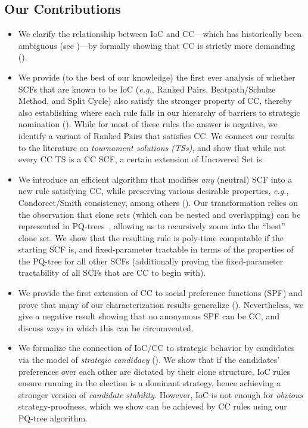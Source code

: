\subsection{Our Contributions}
\begin{itemize}[leftmargin=*]
    \item We clarify the relationship between IoC and CC---which has historically been ambiguous (see )---by formally showing that CC is strictly more demanding (). 
    \item We provide (to the best of our knowledge) the first ever analysis of whether SCFs that are known to be IoC (\emph{e.g.}, Ranked Pairs, Beatpath/Schulze Method, and Split Cycle) also satisfy the stronger property of CC, thereby also establishing where each rule falls in our hierarchy of barriers to strategic nomination (). While for most of these rules the answer is negative, we identify a variant of Ranked Pairs that satisfies CC. We connect our results to the literature on \emph{tournament solutions (TSs)}, and show that while not every CC TS is a CC SCF, a certain extension of Uncovered Set is.
    \item We introduce an efficient algorithm that modifies \emph{any} (neutral) SCF into a new rule satisfying CC, while preserving various desirable properties, \emph{e.g.}, Condorcet/Smith consistency, among others (). Our transformation relies on the observation that clone sets (which can be nested and overlapping) can be represented in PQ-trees~\citep{Elkind10:Clone}, allowing us to recursively zoom into the ``best'' clone set. We show that the resulting rule is poly-time computable if the starting SCF is, and fixed-parameter tractable in terms of the properties of the PQ-tree for all other SCFs (additionally proving the fixed-parameter tractability of all SCFs that are CC to begin with).
    \item We provide the first extension of CC to social preference functions (SPF) and prove that many of our characterization results generalize (). Nevertheless, we give a negative result showing that no anonymous SPF can be CC, and discuss ways in which this can be circumvented.
    \item We formalize the connection of IoC/CC to strategic behavior by candidates via the model of \emph{strategic candidacy} \citep{Dutta01:Strategic} (). We show that if the candidates' preferences over each other are dictated by their clone structure, IoC rules ensure running in the election is a dominant strategy, hence achieving a stronger version of \emph{candidate stability}. However, IoC is not enough for \emph{obvious} strategy-proofness, which we show can be achieved by CC rules using our PQ-tree algorithm. 
\end{itemize} 
